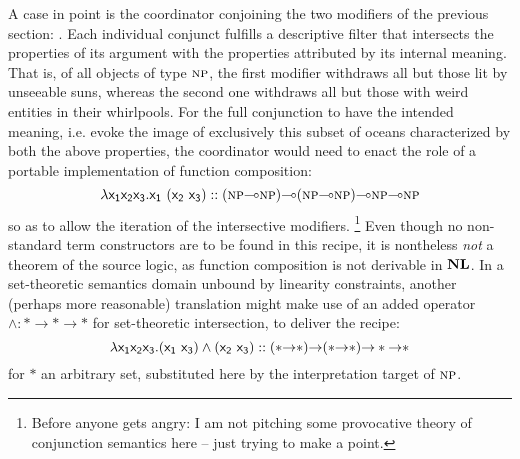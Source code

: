 A case in point is the coordinator  conjoining the two modifiers of the previous section: .
Each individual conjunct fulfills a descriptive filter that intersects the properties of its argument with the properties attributed by its internal meaning.
That is, of all objects of type $\smallprop{NP}$, the first modifier withdraws all but those lit by unseeable suns, whereas the second one withdraws all but those with weird entities in their whirlpools.
For the full conjunction to have the intended meaning, i.e. evoke the image of exclusively this subset of oceans characterized by both the above properties, the coordinator would need to enact the role of a portable implementation of function composition:
\[
\lambda \smallterm{x_1x_2x_3.x_1~(x_2~x_3)} :: (\smallprop{np}\li \smallprop{np})\li(\smallprop{np}\li \smallprop{np})\li\smallprop{np}\li\smallprop{np}
\]
so as to allow the iteration of the intersective modifiers.%
\footnote{Before anyone gets angry: I am not pitching some provocative theory of conjunction semantics here -- just trying to make a point.}
Even though no non-standard term constructors are to be found in this recipe, it is nontheless \textit{not} a theorem of the source logic, as function composition is not derivable in $\textbf{NL}$.
In a set-theoretic semantics domain unbound by linearity constraints, another (perhaps more reasonable) translation might make use of an added operator $\wedge : * \to * \to *$ for set-theoretic intersection, to deliver the recipe:
\[
\lambda \smallterm{x_1x_2x_3.(x_1~x_3)\wedge(x_2~x_3)} :: (*\ii *)\ii(*\ii *)\ii * \ii *
\]
for $*$ an arbitrary set, substituted here by the interpretation target of $\smallprop{NP}$.

